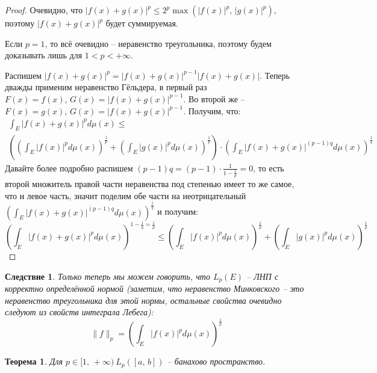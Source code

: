 \documentclass[a4paper,12pt]{article}
\renewcommand{\leq}{\ensuremath{\leqslant}}
\theoremstyle{plain}
\newtheorem{theorem}{Теорема}[section]
\newtheorem*{corollary}{Следствие}
\theoremstyle{definition}
\theoremstyle{remark}
\begin{document}
\begin{proof}
	Очевидно, что $|f(x) + g(x)|^p \leq 2^p \max(|f(x)|^p,\, |g(x)|^p)$, поэтому $|f(x) + g(x)|^p$ будет суммируемая.

	Если $p = 1$, то всё очевидно -- неравенство треугольника, поэтому будем доказывать лишь для $1 < p < +\infty$.

	Распишем $|f(x) + g(x)|^p = |f(x) + g(x)|^{p - 1}|f(x) + g(x)|$. Теперь дважды применим неравенство Гёльдера, в первый раз $F(x) = f(x),\, G(x) = |f(x) + g(x)|^{p - 1}$. Во второй же -- $F(x) = g(x),\, G(x) = |f(x) + g(x)|^{p - 1}$. Получим, что:
	\begin{align*}
		\int_E |f(x) + g(x)|^p d\mu(x) \leq \\
		\left(\left(\int_E |f(x)|^pd\mu(x)\right)^{\frac{1}{p}} + \left(\int_E |g(x)|^pd\mu(x)\right)^{\frac{1}{p}}\right) \cdot \left(\int_E |f(x) + g(x)|^{(p - 1)q}d\mu(x)\right)^{\frac{1}{q}}
	\end{align*}
	Давайте более подробно распишем $(p - 1)q = (p - 1)\cdot\frac{1}{1 - \frac{1}{p}} = 0$, то есть второй множитель правой части неравенства под степенью имеет то же самое, что и левое часть, значит поделим обе части на неотрицательный $\left(\int_E |f(x) + g(x)|^{(p - 1)q}d\mu(x)\right)^{\frac{1}{q}}$ и получим:
	\[\left(\int_E |f(x) + g(x)|^p d\mu(x)\right)^{1 - \frac{1}{q} = \frac{1}{p}} \leq \left(\int_E |f(x)|^pd\mu(x)\right)^{\frac{1}{p}} + \left(\int_E |g(x)|^pd\mu(x)\right)^{\frac{1}{p}}\]
\end{proof}

\begin{corollary}
	Только теперь мы можем говорить, что $L_p(E)$ -- ЛНП с корректно определённой нормой (заметим, что неравенство Минковского -- это неравенство треугольника для этой нормы, остальные свойства очевидно следуют из свойств интеграла Лебега):
	\[\|f\|_p = \left(\int_E |f(x)|^p d\mu(x)\right)^{\frac{1}{p}}\]
\end{corollary}

\begin{theorem}
	Для $p \in [1,\,+\infty) \: L_p([a,\,b])$ -- банахово пространство.
\end{theorem}
\end{document}
